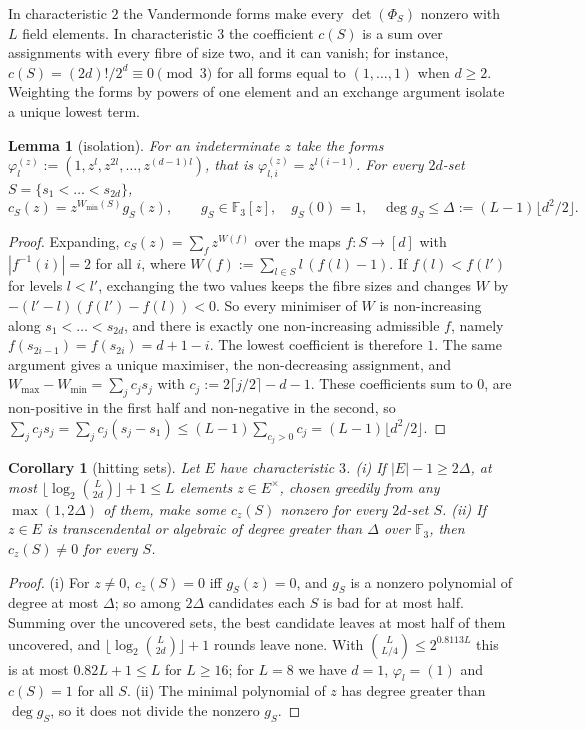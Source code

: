 \documentclass[11pt]{article}
\newtheorem{lemma}[theorem]{Lemma}
\newtheorem{corollary}[theorem]{Corollary}
\theoremstyle{definition}
\theoremstyle{remark}
\newcommand{\F}{\mathbb{F}}
\begin{document}
In characteristic $2$ the Vandermonde forms make every $\det(\Phi_S)$ nonzero with $L$ field elements. In characteristic $3$ the coefficient $c(S)$ is a sum over assignments with every fibre of size two, and it can vanish; for instance, $c(S)=(2d)!/2^d\equiv0\pmod 3$ for all forms equal to $(1,\dots,1)$ when $d\ge2$. Weighting the forms by powers of one element and an exchange argument isolate a unique lowest term.

\begin{lemma}[isolation]\label{lem:M}
For an indeterminate $z$ take the forms $\varphi^{(z)}_l:=(1,z^l,z^{2l},\dots,z^{(d-1)l})$, that is $\varphi^{(z)}_{l,i}=z^{l(i-1)}$. For every $2d$-set $S=\{s_1<\dots<s_{2d}\}$,
\[
c_S(z)=z^{W_{\min}(S)}g_S(z),\qquad g_S\in\F_3[z],\quad g_S(0)=1,\quad\deg g_S\le\Delta:=(L-1)\lfloor d^2/2\rfloor.
\]
\end{lemma}

\begin{proof}
Expanding, $c_S(z)=\sum_fz^{W(f)}$ over the maps $f:S\to[d]$ with $|f^{-1}(i)|=2$ for all $i$, where $W(f):=\sum_{l\in S}l\,(f(l)-1)$. If $f(l)<f(l')$ for levels $l<l'$, exchanging the two values keeps the fibre sizes and changes $W$ by $-(l'-l)(f(l')-f(l))<0$. So every minimiser of $W$ is non-increasing along $s_1<\dots<s_{2d}$, and there is exactly one non-increasing admissible $f$, namely $f(s_{2i-1})=f(s_{2i})=d+1-i$. The lowest coefficient is therefore $1$. The same argument gives a unique maximiser, the non-decreasing assignment, and $W_{\max}-W_{\min}=\sum_jc_js_j$ with $c_j:=2\lceil j/2\rceil-d-1$. These coefficients sum to $0$, are non-positive in the first half and non-negative in the second, so $\sum_jc_js_j=\sum_jc_j(s_j-s_1)\le(L-1)\sum_{c_j>0}c_j=(L-1)\lfloor d^2/2\rfloor$.
\end{proof}

\begin{corollary}[hitting sets]\label{cor:H}
Let $E$ have characteristic $3$. (i) If $|E|-1\ge2\Delta$, at most $\lfloor\log_2\binom L{2d}\rfloor+1\le L$ elements $z\in E^\times$, chosen greedily from any $\max(1,2\Delta)$ of them, make some $c_z(S)$ nonzero for every $2d$-set $S$. (ii) If $z\in E$ is transcendental or algebraic of degree greater than $\Delta$ over $\F_3$, then $c_z(S)\ne0$ for every $S$.
\end{corollary}

\begin{proof}
(i) For $z\ne0$, $c_z(S)=0$ iff $g_S(z)=0$, and $g_S$ is a nonzero polynomial of degree at most $\Delta$; so among $2\Delta$ candidates each $S$ is bad for at most half. Summing over the uncovered sets, the best candidate leaves at most half of them uncovered, and $\lfloor\log_2\binom L{2d}\rfloor+1$ rounds leave none. With $\binom L{L/4}\le2^{0.8113L}$ this is at most $0.82L+1\le L$ for $L\ge16$; for $L=8$ we have $d=1$, $\varphi_l=(1)$ and $c(S)=1$ for all $S$. (ii) The minimal polynomial of $z$ has degree greater than $\deg g_S$, so it does not divide the nonzero $g_S$.
\end{proof}
\end{document}
